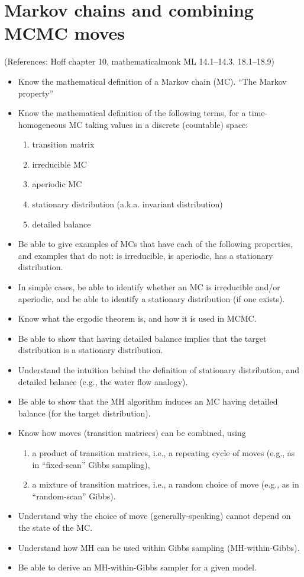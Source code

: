 \documentclass[12pt]{article}
\begin{document}
\section{Markov chains and combining MCMC moves}
(References: Hoff chapter 10, mathematicalmonk ML 14.1--14.3, 18.1--18.9)
\begin{itemize}
\setlength\itemsep{0em}
\item Know the mathematical definition of a Markov chain (MC). ``The Markov property''
\item Know the mathematical definition of the following terms, for a time-homogeneous MC taking values in a discrete (countable) space:
    \begin{enumerate}
        \item transition matrix
        \item irreducible MC
        \item aperiodic MC
        \item stationary distribution (a.k.a. invariant distribution)
        \item detailed balance
    \end{enumerate}
\item Be able to give examples of MCs that have each of the following properties, and examples that do not:
    is irreducible, is aperiodic, has a stationary distribution. 
\item In simple cases, be able to identify whether an MC is irreducible and/or aperiodic,
    and be able to identify a stationary distribution (if one exists).
\item Know what the ergodic theorem is, and how it is used in MCMC.
\item Be able to show that having detailed balance implies that the target distribution is a stationary distribution.
\item Understand the intuition behind the definition of stationary distribution, and detailed balance (e.g., the water flow analogy).
\item Be able to show that the MH algorithm induces an MC having detailed balance (for the target distribution).
\item Know how moves (transition matrices) can be combined, using
    \begin{enumerate}
        \item a product of transition matrices, i.e., a repeating cycle of moves (e.g., as in ``fixed-scan'' Gibbs sampling),
        \item a mixture of transition matrices, i.e., a random choice of move (e.g., as in ``random-scan'' Gibbs).
    \end{enumerate}
\item Understand why the choice of move (generally-speaking) cannot depend on the state of the MC.
\item Understand how MH can be used within Gibbs sampling (MH-within-Gibbs).
\item Be able to derive an MH-within-Gibbs sampler for a given model.
\end{itemize}
\end{document}
